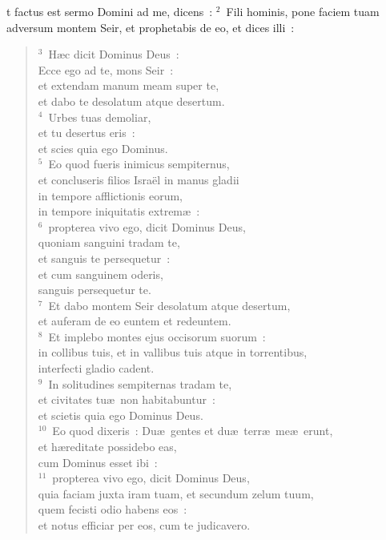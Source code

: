 \bchapter
{}t factus est sermo Domini ad me, dicens~:
${}^{2}$~Fili hominis, pone faciem tuam adversum montem Seir, et prophetabis de eo, et dices illi~:
\begin{verse}${}^{3}$~H\ae c dicit Dominus Deus~:\\ Ecce ego ad te, mons Seir~:\\ et extendam manum meam super te,\\ et dabo te desolatum atque desertum.\\
${}^{4}$~Urbes tuas demoliar,\\ et tu desertus eris~:\\ et scies quia ego Dominus.\\
${}^{5}$~Eo quod fueris inimicus sempiternus,\\ et concluseris filios Isra\"el in manus gladii\\ in tempore afflictionis eorum,\\ in tempore iniquitatis extrem\ae~:\\
${}^{6}$~propterea vivo ego, dicit Dominus Deus,\\ quoniam sanguini tradam te,\\ et sanguis te persequetur~:\\ et cum sanguinem oderis,\\ sanguis persequetur te.\\
${}^{7}$~Et dabo montem Seir desolatum atque desertum,\\ et auferam de eo euntem et redeuntem.\\
${}^{8}$~Et implebo montes ejus occisorum suorum~:\\ in collibus tuis, et in vallibus tuis atque in torrentibus,\\ interfecti gladio cadent.\\
${}^{9}$~In solitudines sempiternas tradam te,\\ et civitates tu\ae\ non habitabuntur~:\\ et scietis quia ego Dominus Deus.\\
${}^{10}$~Eo quod dixeris~: Du\ae\ gentes et du\ae\ terr\ae\ me\ae\ erunt,\\ et h\ae reditate possidebo eas,\\ cum Dominus esset ibi~:\\
${}^{11}$~propterea vivo ego, dicit Dominus Deus,\\ quia faciam juxta iram tuam, et secundum zelum tuum,\\ quem fecisti odio habens eos~:\\ et notus efficiar per eos, cum te judicavero.\\

\end{verse}
